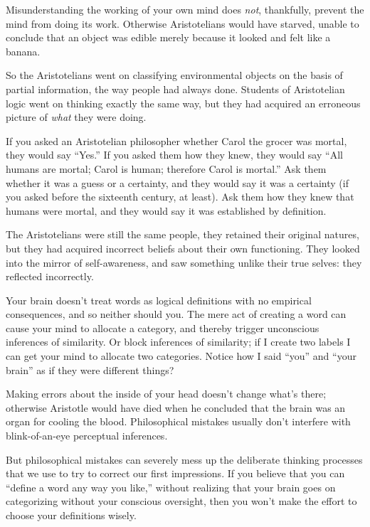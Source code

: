 {
 Misunderstanding the working of your own mind does \textit{not},
thankfully, prevent the mind from doing its work. Otherwise
Aristotelians would have starved, unable to conclude that an object was
edible merely because it looked and felt like a banana.}

{
 So the Aristotelians went on classifying environmental objects on
the basis of partial information, the way people had always done.
Students of Aristotelian logic went on thinking exactly the same way,
but they had acquired an erroneous picture of \textit{what} they were
doing.}

{
 If you asked an Aristotelian philosopher whether Carol the grocer
was mortal, they would say ``Yes.''
If you asked them how they knew, they would say ``All
humans are mortal; Carol is human; therefore Carol is
mortal.'' Ask them whether it was a guess or a
certainty, and they would say it was a certainty (if you asked before
the sixteenth century, at least). Ask them how they knew that humans
were mortal, and they would say it was established by definition.}

{
 The Aristotelians were still the same people, they retained their
original natures, but they had acquired incorrect beliefs about their
own functioning. They looked into the mirror of self-awareness, and saw
something unlike their true selves: they reflected incorrectly.}

{
 Your brain doesn't treat words as logical
definitions with no empirical consequences, and so neither should you.
The mere act of creating a word can cause your mind to allocate a
category, and thereby trigger unconscious inferences of similarity. Or
block inferences of similarity; if I create two labels I can get your
mind to allocate two categories. Notice how I said
``you'' and ``your
brain'' as if they were different things?}

{
 Making errors about the inside of your head
doesn't change what's there; otherwise
Aristotle would have died when he concluded that the brain was an organ
for cooling the blood. Philosophical mistakes usually
don't interfere with blink-of-an-eye perceptual
inferences.}

{
 But philosophical mistakes can severely mess up the deliberate
thinking processes that we use to try to correct our first impressions.
If you believe that you can ``define a word any way
you like,'' without realizing that your brain goes on
categorizing without your conscious oversight, then you
won't make the effort to choose your definitions
wisely.}


